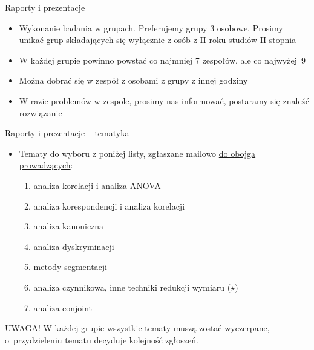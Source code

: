\documentclass{beamer}
\begin{document}
\begin{frame}{Raporty i prezentacje}
  \begin{itemize}
  \item Wykonanie badania w grupach. Preferujemy grupy 3 osobowe. Prosimy unikać grup składających się wyłącznie z osób z II roku studiów II stopnia
  \item W każdej grupie powinno powstać co najmniej 7 zespołów, ale co najwyżej~9
  \item Można dobrać się w zespół z osobami z grupy z innej godziny
  \item W razie problemów w zespole, prosimy nas informować, postaramy się znaleźć rozwiązanie
  \end{itemize}
\end{frame}

\begin{frame}{Raporty i prezentacje -- tematyka}
  \begin{itemize}
  \item Tematy do wyboru z poniżej listy, zgłaszane mailowo \underline{do obojga prowadzących}:
    \begin{enumerate}
    \item analiza korelacji i analiza ANOVA
    \item analiza korespondencji i analiza korelacji
    \item analiza kanoniczna
    \item analiza dyskryminacji
    \item metody segmentacji
    \item analiza czynnikowa, inne techniki redukcji wymiaru ($\star$)
    \item analiza conjoint
    \end{enumerate}
  \end{itemize}
   \begin{alert}{UWAGA!}
     W każdej grupie wszystkie tematy muszą zostać wyczerpane, o~przydzieleniu tematu decyduje kolejność zgłoszeń.
   \end{alert}
\end{frame}
\end{document}

